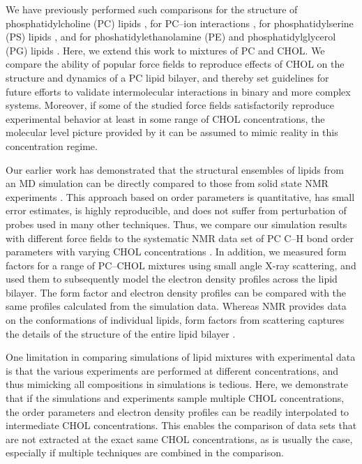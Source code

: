 \documentclass[aps,prl,superscriptaddress]{revtex4-2}
\begin{document}
We have previously performed such comparisons for the structure of phosphatidylcholine (PC) lipids \cite{botan15}, for PC--ion interactions \cite{catte2016molecular}, for phosphatidylserine (PS) lipids \cite{antila2019headgroup}, and for phoshatidylethanolamine (PE) and phosphatidylglycerol (PG) lipids \cite{bacle2021inverse}. Here, we extend this work to mixtures of PC and CHOL. We compare the ability of popular force fields to reproduce effects of CHOL on the structure and dynamics of a PC lipid bilayer, and thereby set guidelines for future efforts to validate intermolecular interactions in binary and more complex systems. Moreover, if some of the studied force fields satisfactorily reproduce experimental behavior at least in some range of CHOL concentrations, the molecular level picture provided by it can be assumed to mimic reality in this concentration regime. 

Our earlier work has demonstrated that the structural ensembles of lipids from an MD simulation can be directly compared to those from solid state NMR experiments \cite{botan15,catte2016molecular,antila2019headgroup,bacle2021inverse}. This approach based on order parameters is quantitative, has small error estimates, is highly reproducible, and does not suffer from perturbation of probes used in many other techniques. Thus, we compare our simulation results with different force fields to the systematic NMR data set of PC C--H bond order parameters with varying CHOL concentrations \cite{ferreira13}. In addition, we measured form factors for a range of PC--CHOL mixtures using small angle X-ray scattering, and used them to subsequently model the electron density profiles across the lipid bilayer. The form factor and electron density profiles can be compared with the same profiles calculated from the simulation data. Whereas NMR provides data on the conformations of individual lipids, form factors from scattering captures the details of the structure of the entire lipid bilayer \cite{ollila16}. 

One limitation in comparing simulations of lipid mixtures with experimental data is that the various experiments are performed at different concentrations, and thus mimicking all compositions in simulations is tedious. Here, we demonstrate that if the simulations and experiments sample multiple CHOL concentrations, the order parameters and electron density profiles can be readily interpolated to intermediate CHOL concentrations. This enables the comparison of data sets that are not extracted at the exact same CHOL concentrations, as is usually the case, especially if multiple techniques are combined in the comparison. 
\end{document}
